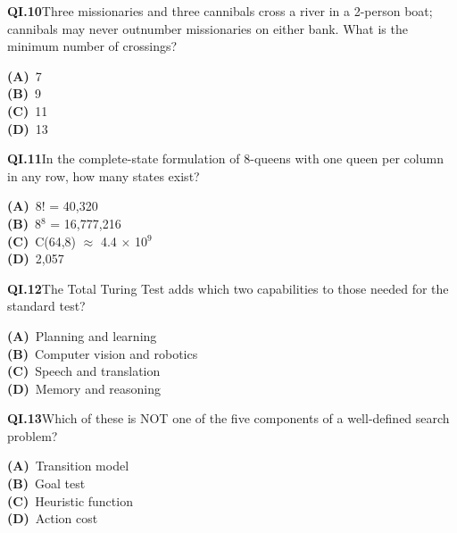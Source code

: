 \documentclass[11pt]{article}
\begin{document}
\begin{tcolorbox}[enhanced,breakable,colback=white,colframe=navyL,arc=2mm,boxrule=0.7pt,left=3mm,right=3mm,top=2mm,bottom=2mm]
\textbf{\color{navy}QI.10}\quad Three missionaries and three cannibals cross a river in a 2-person boat; cannibals may never outnumber missionaries on either bank. What is the minimum number of crossings?\hfill{}\par\smallskip
{\small \textbf{\color{navyL}(A)}\ 7\\[1pt]\textbf{\color{navyL}(B)}\ 9\\[1pt]\textbf{\color{navyL}(C)}\ 11\\[1pt]\textbf{\color{navyL}(D)}\ 13}
\end{tcolorbox}
\begin{tcolorbox}[enhanced,breakable,colback=white,colframe=navyL,arc=2mm,boxrule=0.7pt,left=3mm,right=3mm,top=2mm,bottom=2mm]
\textbf{\color{navy}QI.11}\quad In the complete-state formulation of 8-queens with one queen per column in any row, how many states exist?\hfill{}\par\smallskip
{\small \textbf{\color{navyL}(A)}\ 8! = 40,320\\[1pt]\textbf{\color{navyL}(B)}\ 8$^8$ = 16,777,216\\[1pt]\textbf{\color{navyL}(C)}\ C(64,8) $\approx$ 4.4 $\times$ 10$^9$\\[1pt]\textbf{\color{navyL}(D)}\ 2,057}
\end{tcolorbox}
\begin{tcolorbox}[enhanced,breakable,colback=white,colframe=navyL,arc=2mm,boxrule=0.7pt,left=3mm,right=3mm,top=2mm,bottom=2mm]
\textbf{\color{navy}QI.12}\quad The Total Turing Test adds which two capabilities to those needed for the standard test?\hfill{}\par\smallskip
{\small \textbf{\color{navyL}(A)}\ Planning and learning\\[1pt]\textbf{\color{navyL}(B)}\ Computer vision and robotics\\[1pt]\textbf{\color{navyL}(C)}\ Speech and translation\\[1pt]\textbf{\color{navyL}(D)}\ Memory and reasoning}
\end{tcolorbox}
\begin{tcolorbox}[enhanced,breakable,colback=white,colframe=navyL,arc=2mm,boxrule=0.7pt,left=3mm,right=3mm,top=2mm,bottom=2mm]
\textbf{\color{navy}QI.13}\quad Which of these is NOT one of the five components of a well-defined search problem?\hfill{}\par\smallskip
{\small \textbf{\color{navyL}(A)}\ Transition model\\[1pt]\textbf{\color{navyL}(B)}\ Goal test\\[1pt]\textbf{\color{navyL}(C)}\ Heuristic function\\[1pt]\textbf{\color{navyL}(D)}\ Action cost}
\end{tcolorbox}
\end{document}
